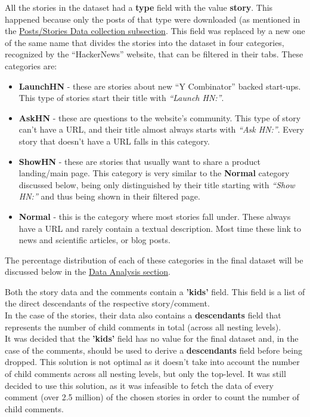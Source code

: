 \documentclass[sigconf]{acmart}
\begin{document}
All the stories in the dataset had a \textbf{type} field with
the value \textbf{story}. This happened because only the posts
of that type were downloaded (as mentioned in the
\hyperref[sec:collection_posts]{Posts/Stories Data collection
subsection}. This field was replaced by a new one of the same
name that divides the stories into the dataset in four categories,
recognized by the ``HackerNews'' website, that can be filtered in
their tabs. These categories are:
\begin{itemize}
    \item \textbf{LaunchHN} - these are stories about new
        ``Y Combinator'' backed start-ups. This type of stories
        start their title with \textit{``Launch HN:''}.
    \item \textbf{AskHN} - these are questions to the website's
        community. This type of story can't have a URL, and their
        title almost always starts with \textit{``Ask HN:''}.
        Every story that doesn't have a URL falls in this category.
    \item \textbf{ShowHN} - these are stories that usually want to
        share a product landing/main page. This category is very
        similar to the \textbf{Normal} category discussed below,
        being only distinguished by their title starting with
        \textit{``Show HN:''} and thus being shown in their
        filtered page.
    \item \textbf{Normal} - this is the category where most
        stories fall under. These always have a URL and rarely
        contain a textual description. Most time these link
        to news and scientific articles, or blog posts.
\end{itemize}
The percentage distribution of each of these categories in
the final dataset will be discussed below in the
\hyperref[sec:analysis]{Data Analysis section}.

Both the story data and the comments contain a \textbf{'kids'}
field. This field is a list of the direct descendants of
the respective story/comment.\\
In the case of the stories, their data also contains a
\textbf{descendants} field that represents the number of
child comments in total (across all nesting levels).\\
It was decided that the \textbf{'kids'} field has no value
for the final dataset and, in the case of the comments,
should be used to derive a \textbf{descendants} field
before being dropped. This solution is not optimal as
it doesn't take into account the number of child
comments across all nesting levels, but only the top-level.
It was still decided to use this solution, as it was
infeasible to fetch the data of every comment (over
2.5 million) of the chosen stories in order to count
the number of child comments.
\end{document}

